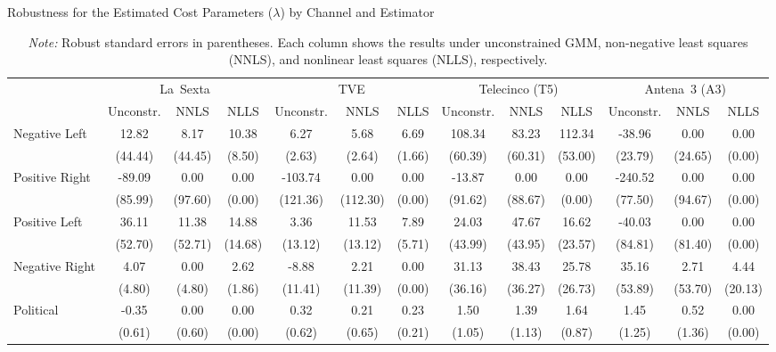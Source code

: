 \documentclass[12pt]{article}
\begin{document}
\begin{table}
\caption{Robustness for the Estimated Cost Parameters ($\lambda$) by Channel and Estimator}
\label{tab:costs_robust}
\centering\small
\begin{tabular}{l|ccc|ccc|ccc|ccc|}
	\toprule
	& \multicolumn{3}{c|}{La~Sexta} & \multicolumn{3}{c|}{TVE} & \multicolumn{3}{c|}{Telecinco (T5)} & \multicolumn{3}{c|}{Antena~3 (A3)} \\
	& Unconstr. & NNLS & NLLS & Unconstr. & NNLS & NLLS & Unconstr. & NNLS & NLLS & Unconstr. & NNLS & NLLS \\
	\midrule
	Negative Left & 12.82 & 8.17 & 10.38 & 6.27 & 5.68 & 6.69 & 108.34 & 83.23 & 112.34 & -38.96 & 0.00 & 0.00 \\
	& (44.44) & (44.45) & (8.50) & (2.63) & (2.64) & (1.66) & (60.39) & (60.31) & (53.00) & (23.79) & (24.65) & (0.00) \\
	\midrule
	Positive Right & -89.09 & 0.00 & 0.00 & -103.74 & 0.00 & 0.00 & -13.87 & 0.00 & 0.00 & -240.52 & 0.00 & 0.00 \\
	& (85.99) & (97.60) & (0.00) & (121.36) & (112.30) & (0.00) & (91.62) & (88.67) & (0.00) & (77.50) & (94.67) & (0.00) \\
	\midrule
	Positive Left & 36.11 & 11.38 & 14.88 & 3.36 & 11.53 & 7.89 & 24.03 & 47.67 & 16.62 & -40.03 & 0.00 & 0.00 \\
	& (52.70) & (52.71) & (14.68) & (13.12) & (13.12) & (5.71) & (43.99) & (43.95) & (23.57) & (84.81) & (81.40) & (0.00) \\
	\midrule
	Negative Right & 4.07 & 0.00 & 2.62 & -8.88 & 2.21 & 0.00 & 31.13 & 38.43 & 25.78 & 35.16 & 2.71 & 4.44 \\
	& (4.80) & (4.80) & (1.86) & (11.41) & (11.39) & (0.00) & (36.16) & (36.27) & (26.73) & (53.89) & (53.70) & (20.13) \\
	\midrule
	Political & -0.35 & 0.00 & 0.00 & 0.32 & 0.21 & 0.23 & 1.50 & 1.39 & 1.64 & 1.45 & 0.52 & 0.00 \\
	& (0.61) & (0.60) & (0.00) & (0.62) & (0.65) & (0.21) & (1.05) & (1.13) & (0.87) & (1.25) & (1.36) & (0.00) \\
	\midrule
	\bottomrule
\end{tabular}
\vspace{0.5em}
\caption*{\small \emph{Note:} Robust standard errors in parentheses. Each column shows the results under unconstrained GMM, non-negative least squares (NNLS), and nonlinear least squares (NLLS), respectively. }
\end{table}
\end{document}
